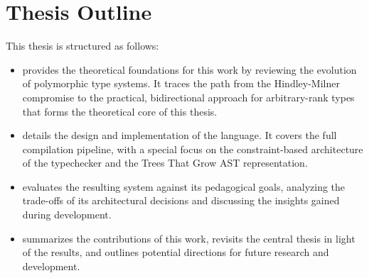 \section{Thesis Outline}

This thesis is structured as follows:

\begin{itemize}
    \item \textbf{} provides the theoretical foundations for this work by reviewing the evolution of polymorphic type systems. It traces the path from the Hindley-Milner compromise to the practical, bidirectional approach for arbitrary-rank types that forms the theoretical core of this thesis.
    \item \textbf{} details the design and implementation of the \Arralac language. It covers the full compilation pipeline, with a special focus on the constraint-based architecture of the typechecker and the Trees That Grow AST representation.
    \item \textbf{} evaluates the resulting system against its pedagogical goals, analyzing the trade-offs of its architectural decisions and discussing the insights gained during development.
    \item \textbf{} summarizes the contributions of this work, revisits the central thesis in light of the results, and outlines potential directions for future research and development.
\end{itemize}